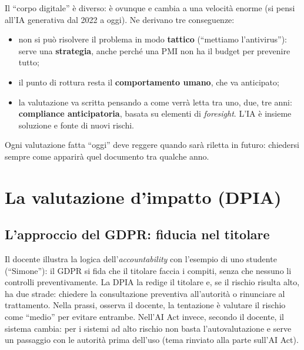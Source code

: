 Il ``corpo digitale'' è diverso: è ovunque e cambia a una velocità enorme (si pensi all'IA
generativa dal 2022 a oggi). Ne derivano tre conseguenze:
\begin{itemize}
  \item non si può risolvere il problema in modo \textbf{tattico} (``mettiamo l'antivirus''): serve una
    \textbf{strategia}, anche perché una PMI non ha il budget per prevenire tutto;
  \item il punto di rottura resta il \textbf{comportamento umano}, che va anticipato;
  \item la valutazione va scritta pensando a come verrà letta tra uno, due, tre anni:
    \textbf{compliance anticipatoria}, basata su elementi di \emph{foresight}. L'IA è insieme
    soluzione e fonte di nuovi rischi.
\end{itemize}

\begin{nota}
Ogni valutazione fatta ``oggi'' deve reggere quando sarà riletta in futuro: chiedersi sempre come
apparirà quel documento tra qualche anno.
\end{nota}

\section{La valutazione d'impatto (DPIA)}

\subsection{L'approccio del GDPR: fiducia nel titolare}
Il docente illustra la logica dell'\emph{accountability} con l'esempio di uno studente
(``Simone''): il GDPR si fida che il titolare faccia i compiti, senza che nessuno li controlli
preventivamente. La DPIA la redige il titolare e, se il rischio risulta alto, ha due strade: chiedere
la consultazione preventiva all'autorità o rinunciare al trattamento. Nella prassi, osserva il
docente, la tentazione è valutare il rischio come ``medio'' per evitare entrambe. Nell'AI Act invece,
secondo il docente, il sistema cambia: per i sistemi ad alto rischio non basta l'autovalutazione e
serve un passaggio con le autorità prima dell'uso (tema rinviato alla parte sull'AI Act).

